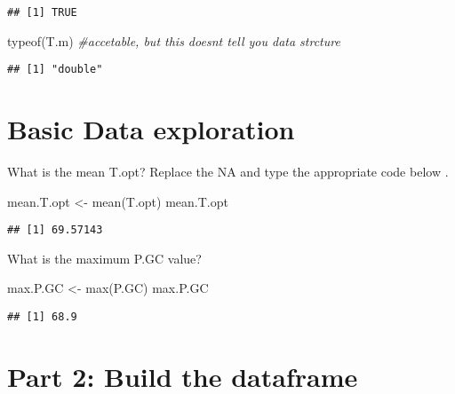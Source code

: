 \documentclass[
]{book}
\newenvironment{Shaded}{\begin{snugshade}}{\end{snugshade}}
\newcommand{\CommentTok}[1]{\textcolor[rgb]{0.56,0.35,0.01}{\textit{#1}}}
\newcommand{\FunctionTok}[1]{\textcolor[rgb]{0.00,0.00,0.00}{#1}}
\newcommand{\NormalTok}[1]{#1}
\newcommand{\OtherTok}[1]{\textcolor[rgb]{0.56,0.35,0.01}{#1}}
\begin{document}
\begin{verbatim}
## [1] TRUE
\end{verbatim}

\begin{Shaded}
\begin{Highlighting}[]
\FunctionTok{typeof}\NormalTok{(T.m) }\CommentTok{\#accetable, but this doesn\textquotesingle{}t tell you data strcture}
\end{Highlighting}
\end{Shaded}

\begin{verbatim}
## [1] "double"
\end{verbatim}

\hypertarget{basic-data-exploration}{%
\section{Basic Data exploration}\label{basic-data-exploration}}

What is the mean T.opt? Replace the NA and type the appropriate code below .

\begin{Shaded}
\begin{Highlighting}[]
\NormalTok{mean.T.opt }\OtherTok{\textless{}{-}} \FunctionTok{mean}\NormalTok{(T.opt)}
\NormalTok{mean.T.opt}
\end{Highlighting}
\end{Shaded}

\begin{verbatim}
## [1] 69.57143
\end{verbatim}

What is the maximum P.GC value?

\begin{Shaded}
\begin{Highlighting}[]
\NormalTok{max.P.GC }\OtherTok{\textless{}{-}} \FunctionTok{max}\NormalTok{(P.GC)}
\NormalTok{max.P.GC}
\end{Highlighting}
\end{Shaded}

\begin{verbatim}
## [1] 68.9
\end{verbatim}

\hypertarget{part-2-build-the-dataframe}{%
\section{Part 2: Build the dataframe}\label{part-2-build-the-dataframe}}
\end{document}
